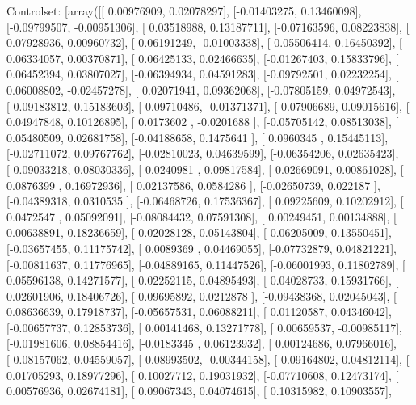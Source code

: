 \documentclass{article}
\begin{document}
Controlset: [array([[ 0.00976909,  0.02078297],
       [-0.01403275,  0.13460098],
       [-0.09799507, -0.00951306],
       [ 0.03518988,  0.13187711],
       [-0.07163596,  0.08223838],
       [ 0.07928936,  0.00960732],
       [-0.06191249, -0.01003338],
       [-0.05506414,  0.16450392],
       [ 0.06334057,  0.00370871],
       [ 0.06425133,  0.02466635],
       [-0.01267403,  0.15833796],
       [ 0.06452394,  0.03807027],
       [-0.06394934,  0.04591283],
       [-0.09792501,  0.02232254],
       [ 0.06008802, -0.02457278],
       [ 0.02071941,  0.09362068],
       [-0.07805159,  0.04972543],
       [-0.09183812,  0.15183603],
       [ 0.09710486, -0.01371371],
       [ 0.07906689,  0.09015616],
       [ 0.04947848,  0.10126895],
       [ 0.0173602 , -0.0201688 ],
       [-0.05705142,  0.08513038],
       [ 0.05480509,  0.02681758],
       [-0.04188658,  0.1475641 ],
       [ 0.0960345 ,  0.15445113],
       [-0.02711072,  0.09767762],
       [-0.02810023,  0.04639599],
       [-0.06354206,  0.02635423],
       [-0.09033218,  0.08030336],
       [-0.0240981 ,  0.09817584],
       [ 0.02669091,  0.00861028],
       [ 0.0876399 ,  0.16972936],
       [ 0.02137586,  0.0584286 ],
       [-0.02650739,  0.022187  ],
       [-0.04389318,  0.0310535 ],
       [-0.06468726,  0.17536367],
       [ 0.09225609,  0.10202912],
       [ 0.0472547 ,  0.05092091],
       [-0.08084432,  0.07591308],
       [ 0.00249451,  0.00134888],
       [ 0.00638891,  0.18236659],
       [-0.02028128,  0.05143804],
       [ 0.06205009,  0.13550451],
       [-0.03657455,  0.11175742],
       [ 0.0089369 ,  0.04469055],
       [-0.07732879,  0.04821221],
       [-0.00811637,  0.11776965],
       [-0.04889165,  0.11447526],
       [-0.06001993,  0.11802789],
       [ 0.05596138,  0.14271577],
       [ 0.02252115,  0.04895493],
       [ 0.04028733,  0.15931766],
       [ 0.02601906,  0.18406726],
       [ 0.09695892,  0.0212878 ],
       [-0.09438368,  0.02045043],
       [ 0.08636639,  0.17918737],
       [-0.05657531,  0.06088211],
       [ 0.01120587,  0.04346042],
       [-0.00657737,  0.12853736],
       [ 0.00141468,  0.13271778],
       [ 0.00659537, -0.00985117],
       [-0.01981606,  0.08854416],
       [-0.0183345 ,  0.06123932],
       [ 0.00124686,  0.07966016],
       [-0.08157062,  0.04559057],
       [ 0.08993502, -0.00344158],
       [-0.09164802,  0.04812114],
       [ 0.01705293,  0.18977296],
       [ 0.10027712,  0.19031932],
       [-0.07710608,  0.12473174],
       [ 0.00576936,  0.02674181],
       [ 0.09067343,  0.04074615],
       [ 0.10315982,  0.10903557],
\end{document}

